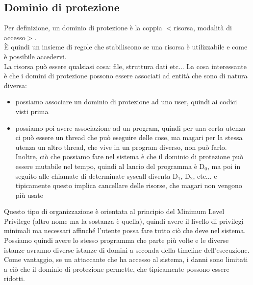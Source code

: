 \documentclass[12pt, oneside]{extbook}
\begin{document}
\subsection{Dominio di protezione}
Per definizione, un dominio di protezione è la coppia $<$risorsa, modalità di accesso$>$.\\È quindi un insieme di regole che stabiliscono se una risorsa è utilizzabile e come è possibile accedervi.\\La risorsa può essere qualsiasi cosa: file, struttura dati etc... La cosa interessante è che i domini di protezione possono essere associati ad entità che sono di natura diversa:
\begin{itemize}
	\item possiamo associare un dominio di protezione ad uno user, quindi ai codici visti prima
	\item possiamo poi avere associazione ad un program, quindi per una certa utenza ci può essere un thread che può eseguire delle cose, ma magari per la stessa utenza un altro thread, che vive in un program diverso, non può farlo. Inoltre, ciò che possiamo fare nel sistema è che il dominio di protezione può essere mutabile nel tempo, quindi al lancio del programma è D$_0$, ma poi in seguito alle chiamate di determinate syscall diventa D$_1$, D$_2$, etc... e tipicamente questo implica cancellare delle risorse, che magari non vengono più usate
\end{itemize}
Questo tipo di organizzazione è orientata al principio del Minimum Level Privilege (altro nome ma la sostanza è quella), quindi avere il livello di privilegi minimali ma necessari affinché l'utente possa fare tutto ciò che deve nel sistema.\\Possiamo quindi avere lo stesso programma che parte più volte e le diverse istanze avranno diverse istanze di domini a seconda della timeline dell'esecuzione.\\Come vantaggio, se un attaccante che ha accesso al sistema, i danni sono limitati a ciò che il dominio di protezione permette, che tipicamente possono essere ridotti.
\end{document}

